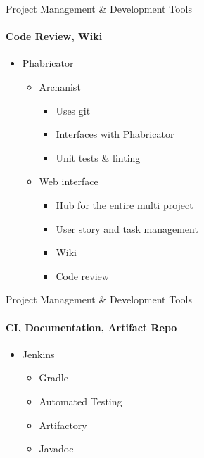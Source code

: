     \begin{frame}[t]{Project Management \& Development Tools}\framesubtitle{Code Review, Wiki}
        \begin{itemize}
        	\item Phabricator
        	\begin{itemize}
        		\item Archanist
                \begin{itemize}
                    \item Uses git
                    \item Interfaces with Phabricator
                    \item Unit tests \& linting
                \end{itemize}
        		\item Web interface
                \begin{itemize}
                    \item Hub for the entire multi project
                    \item User story and task management
                    \item Wiki
                    \item Code review
                \end{itemize}
        	\end{itemize}
        \end{itemize}
    \end{frame}
    \begin{frame}[t]{Project Management \& Development Tools}\framesubtitle{CI, Documentation, Artifact Repo}
        \begin{itemize}
        	\item Jenkins
        	\begin{itemize}
        		\item Gradle
                \item Automated Testing
        		\item Artifactory
                \item Javadoc
        	\end{itemize}
        \end{itemize}
    \end{frame}
